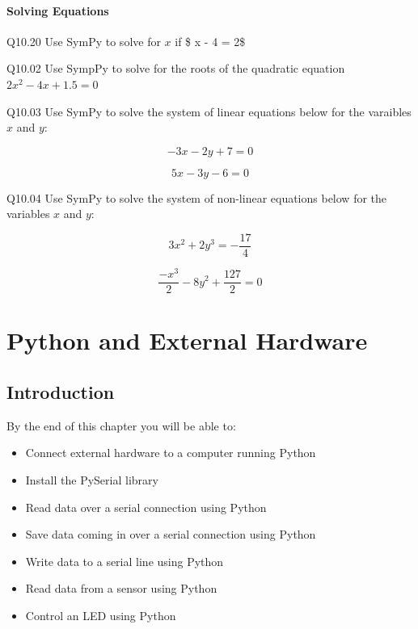 \documentclass{book}
\newenvironment{problems}{}{}  %
\begin{document}
    
        \subsubsection{Solving Equations}\label{solving-equations}
    




    
        \begin{problems}
        Q10.20 Use SymPy to solve for \(x\) if \$ x - 4 = 2\$

Q10.02 Use SympPy to solve for the roots of the quadratic equation
\(2x^2 - 4x + 1.5 = 0\)

Q10.03 Use SymPy to solve the system of linear equations below for the
varaibles \(x\) and \(y\):

\[ -3x - 2y + 7  = 0 \]

\[ 5x - 3y - 6 = 0 \]

Q10.04 Use SymPy to solve the system of non-linear equations below for
the variables \(x\) and \(y\):

\[ 3x^2 + 2y^3 = -\frac{17}{4} \]

\[ \frac{-x^3}{2} - 8y^2 + \frac{127}{2} = 0 \]
        \end{problems}

    




    
        \chapter{Python and External
Hardware}\label{python-and-external-hardware}
    




    
        \section{Introduction}\label{introduction}
    




    
        By the end of this chapter you will be able to:

\begin{itemize}
\item
  Connect external hardware to a computer running Python
\item
  Install the PySerial library
\item
  Read data over a serial connection using Python
\item
  Save data coming in over a serial connection using Python
\item
  Write data to a serial line using Python
\item
  Read data from a sensor using Python
\item
  Control an LED using Python
\end{itemize}
        \newpage
\end{document}

